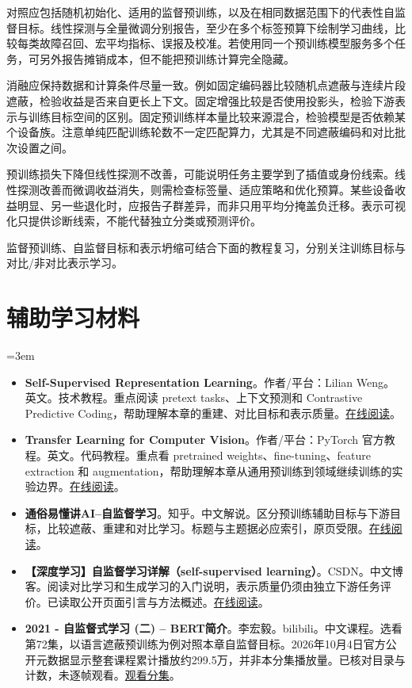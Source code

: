 对照应包括随机初始化、适用的监督预训练，以及在相同数据范围下的代表性自监督目标。线性探测与全量微调分别报告，至少在多个标签预算下绘制学习曲线，比较每类故障召回、宏平均指标、误报及校准。若使用同一个预训练模型服务多个任务，可另外报告摊销成本，但不能把预训练计算完全隐藏。

消融应保持数据和计算条件尽量一致。例如固定编码器比较随机点遮蔽与连续片段遮蔽，检验收益是否来自更长上下文。固定增强比较是否使用投影头，检验下游表示与训练目标空间的区别。固定预训练样本量比较来源混合，检验模型是否依赖某个设备族。注意单纯匹配训练轮数不一定匹配算力，尤其是不同遮蔽编码和对比批次设置之间。

预训练损失下降但线性探测不改善，可能说明任务主要学到了插值或身份线索。线性探测改善而微调收益消失，则需检查标签量、适应策略和优化预算。某些设备收益明显、另一些退化时，应报告子群差异，而非只用平均分掩盖负迁移。表示可视化只提供诊断线索，不能代替独立分类或预测评价。

监督预训练、自监督目标和表示坍缩可结合下面的教程复习，分别关注训练目标与对比/非对比表示学习。
\section*{辅助学习材料}
\begingroup
\emergencystretch=3em
\begin{itemize}
\item \textbf{Self-Supervised Representation Learning}。作者/平台：Lilian Weng。英文。技术教程。重点阅读 pretext tasks、上下文预测和 Contrastive Predictive Coding，帮助理解本章的重建、对比目标和表示质量。\href{https://lilianweng.github.io/posts/2019-11-10-self-supervised/}{在线阅读}。
\item \textbf{Transfer Learning for Computer Vision}。作者/平台：PyTorch 官方教程。英文。代码教程。重点看 pretrained weights、fine-tuning、feature extraction 和 augmentation，帮助理解本章从通用预训练到领域继续训练的实验边界。\href{https://docs.pytorch.org/tutorials/beginner/transfer\_learning\_tutorial.html}{在线阅读}。
\item \textbf{通俗易懂讲AI--自监督学习}。知乎。中文解说。区分预训练辅助目标与下游目标，比较遮蔽、重建和对比学习。标题与主题据必应索引，原页受限。\href{https://zhuanlan.zhihu.com/p/676130861}{在线阅读}。
\item \textbf{【深度学习】自监督学习详解（self-supervised learning）}。CSDN。中文博客。阅读对比学习和生成学习的入门说明，表示质量仍须由独立下游任务评价。已读取公开页面引言与方法概述。\href{https://blog.csdn.net/qq\_51392112/article/details/128806998}{在线阅读}。
\item \textbf{2021 - 自监督式学习 (二) – BERT简介}。李宏毅。bilibili。中文课程。选看第72集，以语言遮蔽预训练为例对照本章自监督目标。2026年10月4日官方公开元数据显示整套课程累计播放约299.5万，并非本分集播放量。已核对目录与计数，未逐帧观看。\href{https://www.bilibili.com/video/BV1Wv411h7kN/?p=72}{观看分集}。
\end{itemize}
\endgroup

